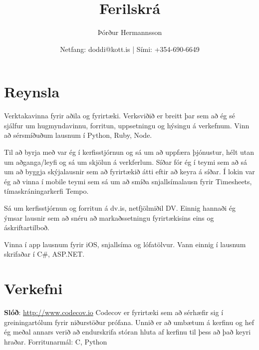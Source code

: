 \documentclass{cv_styles}
\title{Ferilskrá}
\author{Þórður Hermannsson}
\date{Netfang: doddi@kott.is | Sími: +354-690-6649}
\begin{document}
\setcounter{secnumdepth}{0} %
\maketitle
\section{Reynsla}
Verktakavinna fyrir aðila og fyrirtæki. Verksviðið er breitt þar sem að 
ég sé sjálfur um hugmyndavinnu, forritun, uppsetningu og hýsingu á verkefnum.
Vinn að sérsmíðuðum lausnum í Python, Ruby, Node.


Til að byrja með var ég í kerfisstjórnun og sá um að uppfæra þjónustur, hélt utan um aðganga/leyfi og sá um skjölun á verkferlum. Síðar fór ég í teymi sem að sá um að byggja skýjalausnir sem að fyrirtækið átti eftir að keyra á síðar. Í lokin var ég að vinna í mobile teymi sem sá um að smíða snjallsímalausn fyrir Timesheets, tímaskráningarkerfi Tempo.

Sá um kerfisstjórnun og forritun á dv.is, netfjölmiðil DV. Einnig hannaði ég ýmsar lausnir sem að snéru að markaðssetningu fyrirtækisins eins og áskriftartilboð.

Vinna í app lausnum fyrir iOS, snjallsíma og lófatölvur. Vann einnig í lausnum skrifaðar í C\#, ASP.NET.

\section{Verkefni}
\textbf{Slóð}: \href{http://www.codecov.io}{http://www.codecov.io} \newline
Codecov er fyrirtæki sem að sérhæfir sig í greiningartólum fyrir niðurstöður prófana.
Unnið er að umbætum á kerfinu og hef ég meðal annars verið að endurskrifa stóran hluta af kerfinu til þess að það keyri hraðar.
Forritunarmál: C, Python
\end{document}
